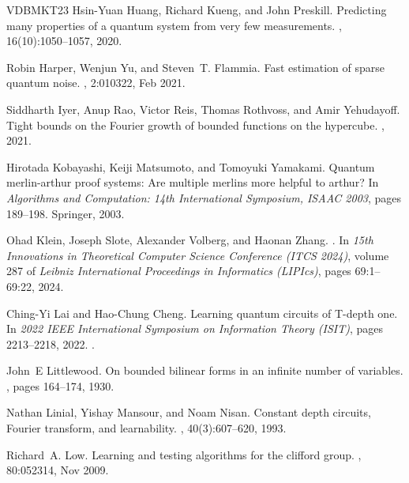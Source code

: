 \documentclass[11pt]{article}
\theoremstyle{plain}
\theoremstyle{plain}
\theoremstyle{definition}
\theoremstyle{remark}
\theoremstyle{named}
\begin{document}
\begin{thebibliography}{VDBMKT23}
Hsin-Yuan Huang, Richard Kueng, and John Preskill.
\newblock Predicting many properties of a quantum system from very few
  measurements.
, 16(10):1050--1057, 2020.

Robin Harper, Wenjun Yu, and Steven~T. Flammia.
\newblock Fast estimation of sparse quantum noise.
, 2:010322, Feb 2021.

Siddharth Iyer, Anup Rao, Victor Reis, Thomas Rothvoss, and Amir Yehudayoff.
\newblock Tight bounds on the {F}ourier growth of bounded functions on the
  hypercube.
, 2021.

Hirotada Kobayashi, Keiji Matsumoto, and Tomoyuki Yamakami.
\newblock Quantum merlin-arthur proof systems: Are multiple merlins more
  helpful to arthur?
\newblock In {\em Algorithms and Computation: 14th International Symposium,
  ISAAC 2003}, pages 189--198. Springer, 2003.

Ohad Klein, Joseph Slote, Alexander Volberg, and Haonan Zhang.
.
\newblock In {\em 15th Innovations in Theoretical Computer Science Conference
  (ITCS 2024)}, volume 287 of {\em Leibniz International Proceedings in
  Informatics (LIPIcs)}, pages 69:1--69:22, 2024.

Ching-Yi Lai and Hao-Chung Cheng.
\newblock Learning quantum circuits of {T}-depth one.
\newblock In {\em 2022 IEEE International Symposium on Information Theory
  (ISIT)}, pages 2213--2218, 2022.
\newblock \href {https://doi.org/10.1109/ISIT50566.2022.9834452}
  {}.

John~E Littlewood.
\newblock On bounded bilinear forms in an infinite number of variables.
, pages 164--174, 1930.

Nathan Linial, Yishay Mansour, and Noam Nisan.
\newblock Constant depth circuits, {F}ourier transform, and learnability.
, 40(3):607--620, 1993.

Richard~A. Low.
\newblock Learning and testing algorithms for the clifford group.
, 80:052314, Nov 2009.


\end{thebibliography}
\end{document}
